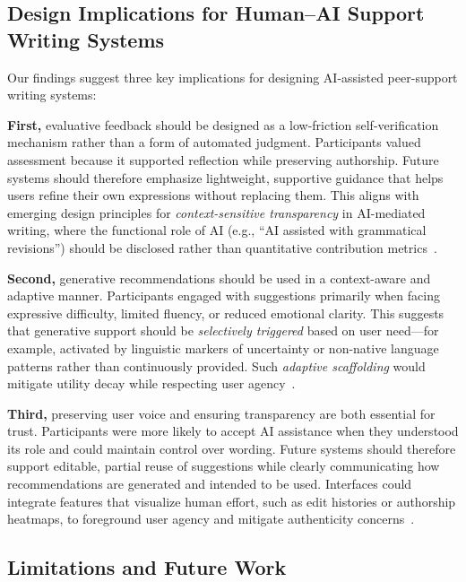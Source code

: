 \documentclass[]{llncs}
\begin{document}
\subsection{Design Implications for Human--AI Support Writing Systems}
Our findings suggest three key implications for designing AI-assisted peer-support writing systems:

\textbf{First,} evaluative feedback should be designed as a low-friction self-verification mechanism rather than a form of automated judgment. Participants valued assessment because it supported reflection while preserving authorship. Future systems should therefore emphasize lightweight, supportive guidance that helps users refine their own expressions without replacing them. This aligns with emerging design principles for \textit{context-sensitive transparency} in AI-mediated writing, where the functional role of AI (e.g., ``AI assisted with grammatical revisions'') should be disclosed rather than quantitative contribution metrics~\cite{Hwang2025Authenticity}.

\textbf{Second,} generative recommendations should be used in a context-aware and adaptive manner. Participants engaged with suggestions primarily when facing expressive difficulty, limited fluency, or reduced emotional clarity. This suggests that generative support should be \textit{selectively triggered} based on user need---for example, activated by linguistic markers of uncertainty or non-native language patterns rather than continuously provided. Such \textit{adaptive scaffolding} would mitigate utility decay while respecting user agency~\cite{Wang2025PeerCounseling}.

\textbf{Third,} preserving user voice and ensuring transparency are both essential for trust. Participants were more likely to accept AI assistance when they understood its role and could maintain control over wording. Future systems should therefore support editable, partial reuse of suggestions while clearly communicating how recommendations are generated and intended to be used. Interfaces could integrate features that visualize human effort, such as edit histories or authorship heatmaps, to foreground user agency and mitigate authenticity concerns~\cite{Hoque2024Hallmark,Peng2025IntentPrism}.


\subsection{Limitations and Future Work}
\end{document}
